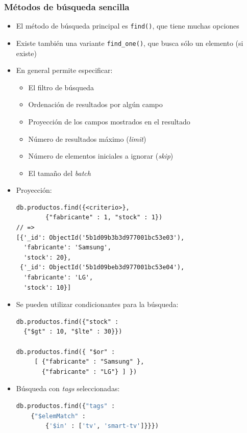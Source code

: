 \documentclass[14pt]{beamer}
\begin{document}
\begin{frame}
  \frametitle{Métodos de búsqueda sencilla}
  \begin{itemize}
  \item El método de búsqueda principal es {\tt find()}, que tiene muchas
    opciones
  \item Existe también una variante {\tt find\_one()}, que busca sólo un
    elemento (si existe)
  \item En general permite especificar:

    \begin{itemize}
    \item El filtro de búsqueda
    \item Ordenación de resultados por algún campo
    \item Proyección de los campos mostrados en el resultado
    \item Número de resultados máximo ({\em limit\/})
    \item Número de elementos iniciales a ignorar ({\em skip\/})
    \item El tamaño del {\em batch}
    \end{itemize}

\framebreak

\item Proyección:
\begin{lstlisting}
db.productos.find({<criterio>},
        {"fabricante" : 1, "stock" : 1})
// =>
[{'_id': ObjectId('5b1d09b3b3d977001bc53e03'),
  'fabricante': 'Samsung',
  'stock': 20},
 {'_id': ObjectId('5b1d09beb3d977001bc53e04'),
  'fabricante': 'LG',
  'stock': 10}]
\end{lstlisting}

  \framebreak

\item Se pueden utilizar condicionantes para la búsqueda:
\begin{lstlisting}
db.productos.find({"stock" :
  {"$gt" : 10, "$lte" : 30}})

db.productos.find({ "$or" :
     [ {"fabricante" : "Samsung" },
       {"fabricante" : "LG"} ] })
\end{lstlisting}

\item Búsqueda con {\em tags\/} seleccionadas:

\begin{lstlisting}[language=python]
db.productos.find({"tags" :
    {"$elemMatch" :
        {'$in' : ['tv', 'smart-tv']}}})
\end{lstlisting}

  \end{itemize}
\end{frame}
\end{document}
